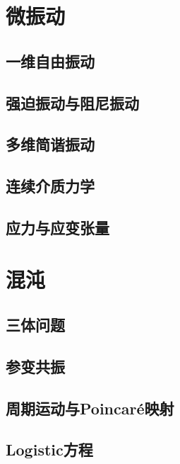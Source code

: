 \chapter{微振动}
\label{sec:vibration}

\section{一维自由振动}

\section{强迫振动与阻尼振动}



\section{多维简谐振动}

\section{连续介质力学}
\label{sec:continuity field}

\section{应力与应变张量}

\chapter{混沌}
\label{sec:chaos}

\section{三体问题}

\section{参变共振}

\section{周期运动与Poincar\'e映射}

\section{Logistic方程}